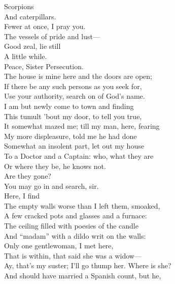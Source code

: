 \documentclass[a4paper,oneside,12pt]{memoir}
\begin{document}
\begin{drama*}
\persecutionspeaks {} Scorpions\\
And caterpillars.\\
\lovewitspeaks {} Fewer at once, I pray you.\\
\persecutionspeaks The vessels of pride and lust---\\
\lovewitspeaks {} Good zeal, lie still\\
A little while.\\
\tribulationspeaks {} Peace, Sister Persecution.\\
\lovewitspeaks The house is mine here and the doors are open;\\
If there be any such persons as you seek for,\\
Use your authority, search on of God's name.\\
I am but newly come to town and finding\\
This tumult 'bout my door, to tell you true,\\
It somewhat mazed me; till my man, here, fearing\\
My more displeasure, told me he had done\\
Somewhat an insolent part, let out my house\\
To a Doctor and a Captain: who, what they are\\
Or where they be, he knows not.\\
\mammonspeaks {} Are they gone?\\
\lovewitspeaks You may go in and search, sir.\\
 Here, I find\\
The empty walls worse than I left them, smoaked,\\
A few cracked pots and glasses and a furnace:\\
The ceiling filled with poesies of the candle\\
And ``madam'' with a dildo writ on the walls:\\
Only one gentlewoman, I met here,\\
That is within, that said she was a widow---\\
\kastrilspeaks Ay, that's my suster; I'll go thump her. Where is she?\\
\lovewitspeaks And should have married a Spanish count, but he,\\

\end{drama*}
\end{document}
